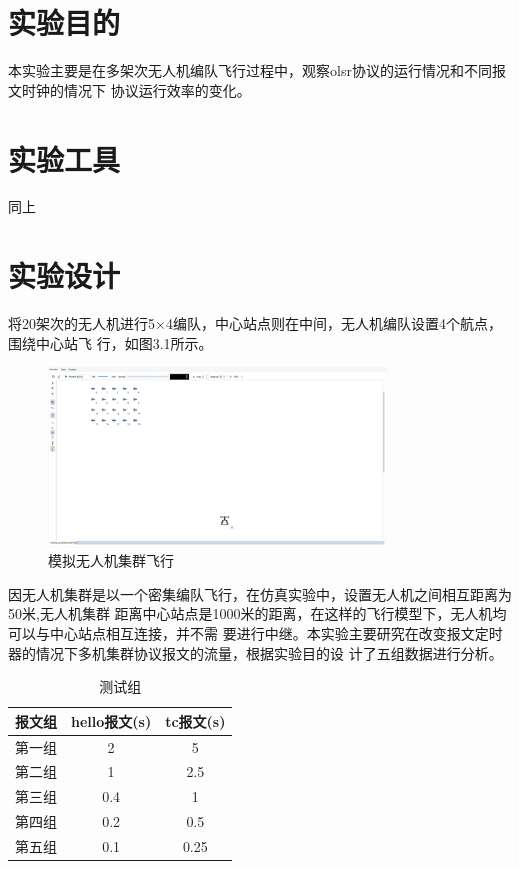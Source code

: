 \documentclass[a4paper,12pt]{report}
\begin{document}
\begin{spacing}{1.5}
\section{实验目的}
本实验主要是在多架次无人机编队飞行过程中，观察olsr协议的运行情况和不同报文时钟的情况下
协议运行效率的变化。
\section{实验工具}
同上
\section{实验设计}
将20架次的无人机进行5×4编队，中心站点则在中间，无人机编队设置4个航点，围绕中心站飞
行，如图3.1所示。
\begin{figure}[hbtp]
\centering
	\includegraphics [width=0.8\textwidth]{figure//fly.png}
	\caption{模拟无人机集群飞行}\label{fly}
\end{figure}

因无人机集群是以一个密集编队飞行，在仿真实验中，设置无人机之间相互距离为50米,无人机集群
距离中心站点是1000米的距离，在这样的飞行模型下，无人机均可以与中心站点相互连接，并不需
要进行中继。本实验主要研究在改变报文定时器的情况下多机集群协议报文的流量，根据实验目的设
计了五组数据进行分析。
\begin{table}[hbtp]
	\centering
	\caption{测试组}
	\begin{tabular}{ccc}
		\hline
		报文组 & hello报文(s) & tc报文(s) \\
		\hline
		第一组 & 2           & 5        \\
		第二组 & 1           & 2.5      \\	
		第三组 & 0.4         & 1        \\
		第四组 & 0.2         & 0.5      \\
		第五组 & 0.1         & 0.25     \\
		\hline
	\end{tabular}
\end{table}


\end{spacing}
\end{document}
